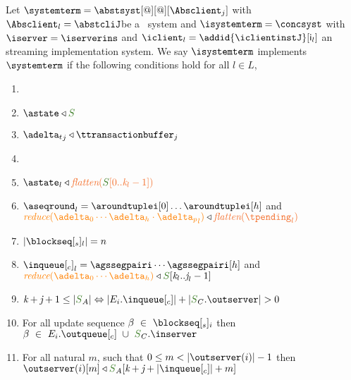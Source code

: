 \begin{definition} \label{def:implementation}
Let  $\systemterm = \abstsyst[@][@][\Absclient_j]$ with $\Absclient_l={\abstcliJ}$be a \tgspcalculus\ system and 
$\isystemterm = \concsyst $  with $\iserver = \iserverins$ and $\iclient_l = \addid{\iclientinstJ}[{\cid{_l}}]$ 
an streaming implementation
system. We say $\isystemterm$ implements $\systemterm$ if the following conditions hold for all $l \in L$,

\begin{enumerate}
	\item {}
	\item $\astate \triangleleft \queuemessage$
	\item \label{prop_transactions} ${\transactionbuffer}_j\triangleleft{\ttransactionbuffer}_j$ 
	\item {}	
	\item \label{prop_state_known} $\astate_l \triangleleft \flatten {\queuemessage[0 .. \tknown_l - 1]}$
	\item \label{prop_pending} $\pending_l = \aroundtuplei[0]\ldots\aroundtuplei[h]$ and $\ireduce{\adelta_0\cdots\adelta_h\cdot {\pushbuffer}_l} \triangleleft \flatten{\tpending_l}$
	\item \label{prop_size_buffersent} $|\tsent_l| = n$ 
	
	\item ${\inclient}_l = \agssegpairi \cdots \agssegpairi[h]$ and $\ireduce{\adelta_0\cdots\adelta_h}\triangleleft  \queuemessage[\tknown_l..\treceivebuffer_l-1]$
	\item $\tknown + \treceivebuffer + 1 \leq |\queuemessage_A| \Leftrightarrow |E_{i}.\inclient| + |\queuemessage_C.\outserver| > 0$
	\item For all update sequence $\beta \ \in \ \tsent_i$ then $\beta \ \in \ E_{i}.\outclient \ \cup \ \queuemessage_C.\inserver$
		\item For all natural $m$, such that $0 \leq m < |\outserver(i)| - 1$ then $\outserver(i)[m] \triangleleft \queuemessage_A[\tknown + \treceivebuffer + |\inclient| + m]$
\end{enumerate}
 
\end{definition}

